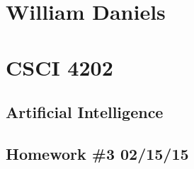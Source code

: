 \documentclass[11pt]{article}
\begin{document}
\begin{center}
\section*{William Daniels}
\section*{CSCI 4202}
\subsection*{Artificial Intelligence}
\subsection*{Homework \#3 02/15/15}
\end{center}
\end{document}
